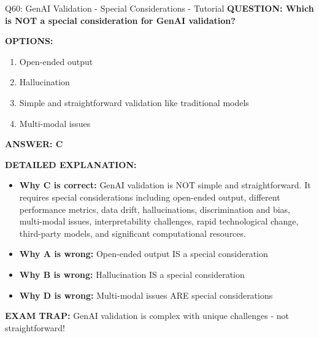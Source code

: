 \documentclass[8pt]{beamer}
\begin{document}
	\begin{frame}{Q60: GenAI Validation - Special Considerations - Tutorial}
		\fontsize{6.5}{7.5}\selectfont
		\textbf{QUESTION: Which is NOT a special consideration for GenAI validation?}
		
		\vspace{0.1cm}
		\textbf{OPTIONS:}
		\begin{enumerate}
			\item Open-ended output
			\item Hallucination
			\item Simple and straightforward validation like traditional models
			\item Multi-modal issues
		\end{enumerate}
		
		\vspace{0.1cm}
		\textcolor{myblue}{\textbf{ANSWER: C}}
		
		\vspace{0.1cm}
		\textbf{DETAILED EXPLANATION:}
		\begin{itemize}
			\item \textbf{Why C is correct:} GenAI validation is NOT simple and straightforward. It requires special considerations including open-ended output, different performance metrics, data drift, hallucinations, discrimination and bias, multi-modal issues, interpretability challenges, rapid technological change, third-party models, and significant computational resources.
			\item \textbf{Why A is wrong:} Open-ended output IS a special consideration
			\item \textbf{Why B is wrong:} Hallucination IS a special consideration
			\item \textbf{Why D is wrong:} Multi-modal issues ARE special considerations
		\end{itemize}
		
		\textcolor{myred}{\textbf{EXAM TRAP:}} GenAI validation is \textcolor{myblue}{complex with unique challenges} - not straightforward!
	\end{frame}
	
\end{document}
